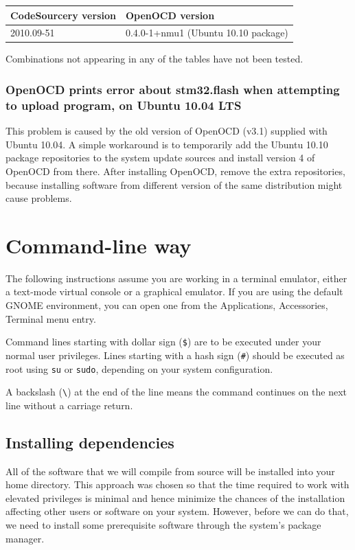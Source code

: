 \documentclass[a4paper, 10pt]{article}
\begin{document}
    \smallskip
    \begin{tabular}{ l | l }
    CodeSourcery version & OpenOCD version \\
    \hline
    2010.09-51          &   0.4.0-1+nmu1 (Ubuntu 10.10 package) \\
    \end{tabular}
    \smallskip

Combinations not appearing in any of the tables have not been tested.

\subsubsection{OpenOCD prints error about stm32.flash
    when attempting to upload program,
    on Ubuntu 10.04 LTS}

This problem is caused by the old version of OpenOCD (v3.1)
supplied with Ubuntu 10.04.
A simple workaround is to temporarily add the Ubuntu 10.10 package repositories
to the system update sources and install version 4 of OpenOCD from there.
After installing OpenOCD, remove the extra repositories,
because installing software from different version of the same distribution
might cause problems.


\newpage

\section{Command-line way}

The following instructions assume you are working in a terminal emulator,
either a text-mode virtual console or a graphical emulator. If you are using the
default GNOME environment, you can open one from the Applications, Accessories,
Terminal menu entry.

Command lines starting with dollar sign (\verb|$|) are to be executed under your
normal user privileges. Lines starting with a hash sign (\verb|#|) should be
executed as root using \verb|su| or \verb|sudo|, depending on your system
configuration.

A backslash (\verb|\|) at the end of the line means the command continues on the
next line without a carriage return.

\subsection{Installing dependencies}

All of the software that we will compile from source will be installed into
your home directory. This approach was chosen so that the time required to
work with elevated privileges is minimal and hence minimize the chances of the
installation affecting other users or software on your system. However, before
we can do that, we need to install some prerequisite software through the
system's package manager.
\end{document}
